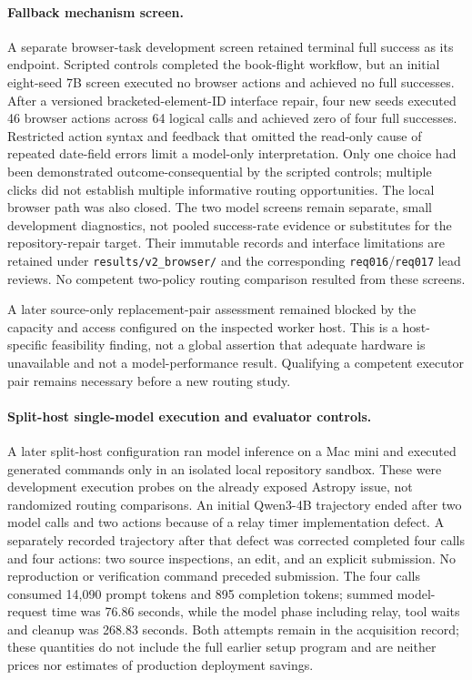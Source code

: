 \paragraph{Fallback mechanism screen.}
A separate browser-task development screen retained terminal full success as its endpoint. Scripted
controls completed the book-flight workflow, but an initial eight-seed 7B screen executed no browser
actions and achieved no full successes. After a versioned bracketed-element-ID interface repair, four
new seeds executed 46 browser actions across 64 logical calls and achieved zero of four full successes. Restricted action
syntax and feedback that omitted the read-only cause of repeated date-field errors limit a model-only
interpretation. Only one choice had been demonstrated outcome-consequential by the scripted controls;
multiple clicks did not establish multiple informative routing opportunities. The local browser path was
also closed. The two model screens remain separate, small development diagnostics, not pooled success-rate
evidence or substitutes for the repository-repair target. Their immutable records and interface limitations
are retained under \texttt{results/v2\_browser/} and the corresponding \texttt{req016}/\texttt{req017}
lead reviews. No competent two-policy routing comparison resulted from these screens.

A later source-only replacement-pair assessment remained blocked by the capacity and access configured
on the inspected worker host. This is a host-specific feasibility finding, not a global assertion that
adequate hardware is unavailable and not a model-performance result. Qualifying a competent executor
pair remains necessary before a new routing study.

\paragraph{Split-host single-model execution and evaluator controls.}
A later split-host configuration ran model inference on a Mac mini and executed generated commands
only in an isolated local repository sandbox. These were development execution probes on the already
exposed Astropy issue, not randomized routing comparisons. An initial Qwen3-4B trajectory ended after
two model calls and two actions because of a relay timer implementation defect. A separately recorded
trajectory after that defect was corrected completed four calls and four actions: two source inspections,
an edit, and an explicit submission. No reproduction or verification command preceded submission.
The four calls consumed 14,090 prompt tokens and 895 completion tokens; summed model-request time
was 76.86 seconds, while the model phase including relay, tool waits and cleanup was 268.83 seconds.
Both attempts remain in the acquisition record; these quantities do not include the full earlier setup
program and are neither prices nor estimates of production deployment savings.

